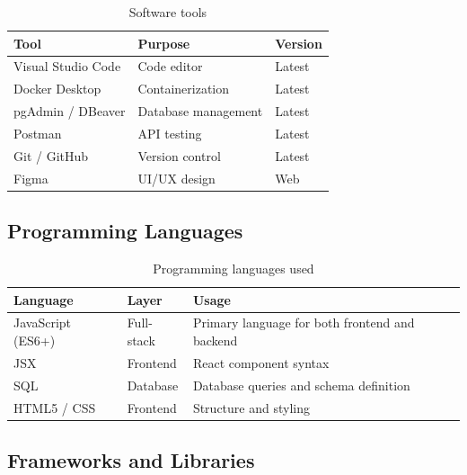 \documentclass[12pt,a4paper,oneside]{report}
\begin{document}
\begin{table}[H]
\centering
\caption{Software tools}
\label{tab:software}
\begin{tabular}{|p{4cm}|p{5cm}|p{4cm}|}
\hline
\textbf{Tool} & \textbf{Purpose} & \textbf{Version} \\
\hline
Visual Studio Code & Code editor & Latest \\
\hline
Docker Desktop & Containerization & Latest \\
\hline
pgAdmin / DBeaver & Database management & Latest \\
\hline
Postman & API testing & Latest \\
\hline
Git / GitHub & Version control & Latest \\
\hline
Figma & UI/UX design & Web \\
\hline
\end{tabular}
\end{table}

\subsection{Programming Languages}

\begin{table}[H]
\centering
\caption{Programming languages used}
\label{tab:languages}
\begin{tabular}{|p{3cm}|p{3cm}|p{7cm}|}
\hline
\textbf{Language} & \textbf{Layer} & \textbf{Usage} \\
\hline
JavaScript (ES6+) & Full-stack & Primary language for both frontend and backend \\
\hline
JSX & Frontend & React component syntax \\
\hline
SQL & Database & Database queries and schema definition \\
\hline
HTML5 / CSS & Frontend & Structure and styling \\
\hline
\end{tabular}
\end{table}

\subsection{Frameworks and Libraries}
\end{document}

